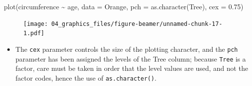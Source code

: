\documentclass[
  9pt,
  a4paper,
  ignorenonframetext,
  notheorems]{beamer}
\newenvironment{Shaded}{\begin{snugshade}}{\end{snugshade}}
\newcommand{\AttributeTok}[1]{\textcolor[rgb]{0.40,0.45,0.13}{#1}}
\newcommand{\FloatTok}[1]{\textcolor[rgb]{0.68,0.00,0.00}{#1}}
\newcommand{\FunctionTok}[1]{\textcolor[rgb]{0.28,0.35,0.67}{#1}}
\newcommand{\NormalTok}[1]{\textcolor[rgb]{0.00,0.23,0.31}{#1}}
\newcommand{\SpecialCharTok}[1]{\textcolor[rgb]{0.37,0.37,0.37}{#1}}
\providecommand{\tightlist}{%
  \setlength{\itemsep}{0pt}\setlength{\parskip}{0pt}}\usepackage{longtable,booktabs,array}
\begin{document}
\begin{frame}[fragile]
\begin{Shaded}
\begin{Highlighting}[]
\FunctionTok{plot}\NormalTok{(circumference }\SpecialCharTok{\textasciitilde{}}\NormalTok{ age, }\AttributeTok{data =}\NormalTok{ Orange, }\AttributeTok{pch =} \FunctionTok{as.character}\NormalTok{(Tree), }\AttributeTok{cex =} \FloatTok{0.75}\NormalTok{)}
\end{Highlighting}
\end{Shaded}

\begin{figure}

{\centering \texttt{[image: 04\_graphics\_files/figure-beamer/unnamed-chunk-17-1.pdf]}

}

\end{figure}

\begin{itemize}
\tightlist
\item
  The \texttt{cex} parameter controls the size of the plotting
  character, and the \texttt{pch} parameter has been assigned the levels
  of the Tree column; because \texttt{Tree} is a factor, care must be
  taken in order that the level values are used, and not the factor
  codes, hence the use of \texttt{as.character()}.
\end{itemize}
\end{frame}
\end{document}
